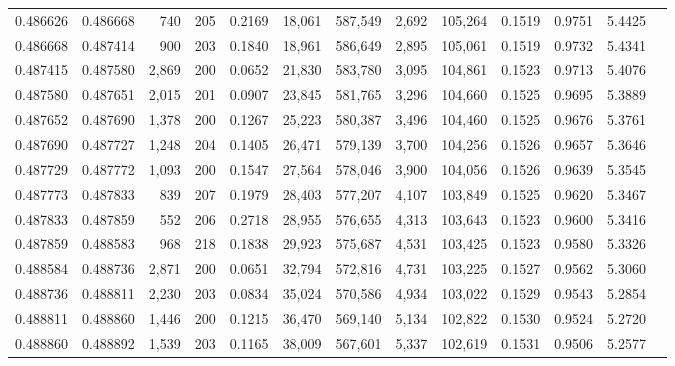\begin{tabular}{rrrrrrrrrrrrr}
0.486626 & 0.486668 &   740 & 205 &                                     0.2169 &  18,061 & 587,549 &   2,692 & 105,264 & 0.1519 & 0.9751 & 5.4425 \\
0.486668 & 0.487414 &   900 & 203 &                                     0.1840 &  18,961 & 586,649 &   2,895 & 105,061 & 0.1519 & 0.9732 & 5.4341 \\
0.487415 & 0.487580 & 2,869 & 200 &                                     0.0652 &  21,830 & 583,780 &   3,095 & 104,861 & 0.1523 & 0.9713 & 5.4076 \\
0.487580 & 0.487651 & 2,015 & 201 &                                     0.0907 &  23,845 & 581,765 &   3,296 & 104,660 & 0.1525 & 0.9695 & 5.3889 \\
0.487652 & 0.487690 & 1,378 & 200 &                                     0.1267 &  25,223 & 580,387 &   3,496 & 104,460 & 0.1525 & 0.9676 & 5.3761 \\
0.487690 & 0.487727 & 1,248 & 204 &                                     0.1405 &  26,471 & 579,139 &   3,700 & 104,256 & 0.1526 & 0.9657 & 5.3646 \\
0.487729 & 0.487772 & 1,093 & 200 &                                     0.1547 &  27,564 & 578,046 &   3,900 & 104,056 & 0.1526 & 0.9639 & 5.3545 \\
0.487773 & 0.487833 &   839 & 207 &                                     0.1979 &  28,403 & 577,207 &   4,107 & 103,849 & 0.1525 & 0.9620 & 5.3467 \\
0.487833 & 0.487859 &   552 & 206 &                                     0.2718 &  28,955 & 576,655 &   4,313 & 103,643 & 0.1523 & 0.9600 & 5.3416 \\
0.487859 & 0.488583 &   968 & 218 &                                     0.1838 &  29,923 & 575,687 &   4,531 & 103,425 & 0.1523 & 0.9580 & 5.3326 \\
0.488584 & 0.488736 & 2,871 & 200 &                                     0.0651 &  32,794 & 572,816 &   4,731 & 103,225 & 0.1527 & 0.9562 & 5.3060 \\
0.488736 & 0.488811 & 2,230 & 203 &                                     0.0834 &  35,024 & 570,586 &   4,934 & 103,022 & 0.1529 & 0.9543 & 5.2854 \\
0.488811 & 0.488860 & 1,446 & 200 &                                     0.1215 &  36,470 & 569,140 &   5,134 & 102,822 & 0.1530 & 0.9524 & 5.2720 \\
0.488860 & 0.488892 & 1,539 & 203 &                                     0.1165 &  38,009 & 567,601 &   5,337 & 102,619 & 0.1531 & 0.9506 & 5.2577 \\

\end{tabular}
